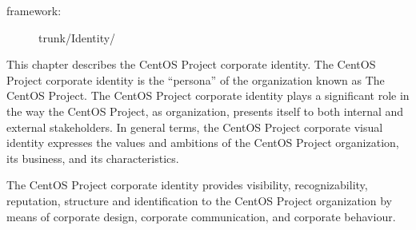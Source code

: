 
\begin{description}
\item[framework:] trunk/Identity/
\end{description}

\noindent This chapter describes the CentOS Project corporate
identity. The CentOS Project corporate identity is the ``persona'' of
the organization known as The CentOS Project.  The CentOS Project
corporate identity plays a significant role in the way the CentOS
Project, as organization, presents itself to both internal and
external stakeholders. In general terms, the CentOS Project corporate
visual identity expresses the values and ambitions of the CentOS
Project organization, its business, and its characteristics.  

The CentOS Project corporate identity provides visibility,
recognizability, reputation, structure and identification to the
CentOS Project organization by means of corporate design, corporate
communication, and corporate behaviour.

